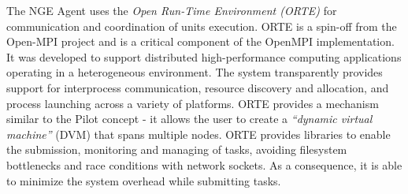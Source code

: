 



The NGE Agent uses the \emph{Open Run-Time Environment (ORTE)} for communication
and coordination of units execution. ORTE is a spin-off from the Open-MPI
project and is a critical component of the OpenMPI implementation. It was
developed to support distributed high-performance computing applications
operating in a heterogeneous environment. The system transparently provides
support for interprocess communication, resource discovery and allocation, and
process launching across a variety of platforms. ORTE provides a mechanism
similar to the Pilot concept - it allows the user to create a \emph{``dynamic
virtual machine''} (DVM) that spans multiple nodes. ORTE provides libraries to
enable the submission, monitoring and managing of tasks, avoiding filesystem
bottlenecks and race conditions with network sockets. As a consequence, it is
able to minimize the system overhead while submitting tasks.

%

